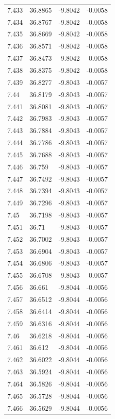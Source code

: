 \begin{tabular}{llll}
7.433 & 36.8865 & -9.8042 & -0.0058 \\
7.434 & 36.8767 & -9.8042 & -0.0058 \\
7.435 & 36.8669 & -9.8042 & -0.0058 \\
7.436 & 36.8571 & -9.8042 & -0.0058 \\
7.437 & 36.8473 & -9.8042 & -0.0058 \\
7.438 & 36.8375 & -9.8042 & -0.0058 \\
7.439 & 36.8277 & -9.8043 & -0.0057 \\
7.44 & 36.8179 & -9.8043 & -0.0057 \\
7.441 & 36.8081 & -9.8043 & -0.0057 \\
7.442 & 36.7983 & -9.8043 & -0.0057 \\
7.443 & 36.7884 & -9.8043 & -0.0057 \\
7.444 & 36.7786 & -9.8043 & -0.0057 \\
7.445 & 36.7688 & -9.8043 & -0.0057 \\
7.446 & 36.759 & -9.8043 & -0.0057 \\
7.447 & 36.7492 & -9.8043 & -0.0057 \\
7.448 & 36.7394 & -9.8043 & -0.0057 \\
7.449 & 36.7296 & -9.8043 & -0.0057 \\
7.45 & 36.7198 & -9.8043 & -0.0057 \\
7.451 & 36.71 & -9.8043 & -0.0057 \\
7.452 & 36.7002 & -9.8043 & -0.0057 \\
7.453 & 36.6904 & -9.8043 & -0.0057 \\
7.454 & 36.6806 & -9.8043 & -0.0057 \\
7.455 & 36.6708 & -9.8043 & -0.0057 \\
7.456 & 36.661 & -9.8044 & -0.0056 \\
7.457 & 36.6512 & -9.8044 & -0.0056 \\
7.458 & 36.6414 & -9.8044 & -0.0056 \\
7.459 & 36.6316 & -9.8044 & -0.0056 \\
7.46 & 36.6218 & -9.8044 & -0.0056 \\
7.461 & 36.612 & -9.8044 & -0.0056 \\
7.462 & 36.6022 & -9.8044 & -0.0056 \\
7.463 & 36.5924 & -9.8044 & -0.0056 \\
7.464 & 36.5826 & -9.8044 & -0.0056 \\
7.465 & 36.5728 & -9.8044 & -0.0056 \\
7.466 & 36.5629 & -9.8044 & -0.0056 \\

\end{tabular}
